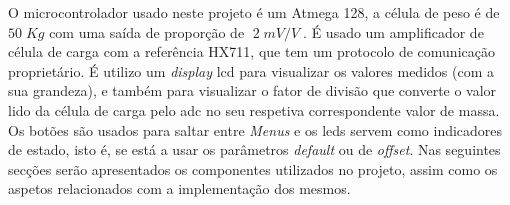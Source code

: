 O microcontrolador usado neste projeto é um Atmega 128, a célula de peso é de $50 \; Kg$ com uma saída de proporção de $\; 2 \; mV/V \;$. É usado um amplificador de célula de carga com a referência HX711, que tem um protocolo de comunicação proprietário.
É utilizo um \textit{display} \acs{lcd} para visualizar os valores medidos (com a sua grandeza), e também para visualizar o fator de divisão que converte o valor lido da célula de carga pelo \acs{adc} no seu respetiva correspondente valor de massa. Os
botões são usados para saltar entre \textit{Menus} e os \acsp{led} servem como indicadores de estado, isto é, se está a usar os parâmetros \textit{default} ou de \textit{offset}.
\emptyline
Nas seguintes secções serão apresentados os componentes utilizados no projeto, assim como os aspetos relacionados com a implementação dos mesmos.
\newpage
